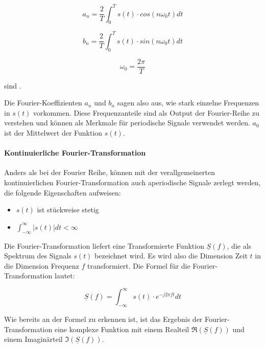 \begin{equation}
a_n = \frac{2}{T} \int_{0}^{T} s(t) \cdot cos(n\omega_0t) dt
\end{equation}

\begin{equation}
b_n = \frac{2}{T} \int_{0}^{T} s(t) \cdot sin(n\omega_0t) dt
\end{equation}

\begin{equation}
\omega_0 = \frac{2\pi}{T}
\end{equation}

sind \autocite[vgl.][S. 19f]{ries_fourier-reihe_2018}.

Die Fourier-Koeffizienten $a_n$ und $b_n$ sagen also aus, wie stark einzelne Frequenzen in $s(t)$ vorkommen.
Diese Frequenzanteile sind als Output der Fourier-Reihe zu verstehen und können als Merkmale für periodische Signale verwendet werden.
$a_0$ ist der Mittelwert der Funktion $s(t)$.

\paragraph{Kontinuierliche Fourier-Transformation}


Anders als bei der Fourier Reihe, können mit der verallgemeinerten kontinuierlichen Fourier-Transformation auch aperiodische Signale zerlegt werden, die folgende Eigenschaften aufweisen:

\begin{itemize}
    \item $s(t)$ ist stückweise stetig
    \item $\int_{-\infty}^{\infty} |s(t)| dt < \infty$
\end{itemize}

Die Fourier-Transformation liefert eine Transformierte Funktion $\underline{S}(f)$, die als Spektrum des Signals $s(t)$ bezeichnet wird.
Es wird also die Dimension Zeit $t$ in die Dimension Frequenz $f$ transformiert.
Die Formel für die Fourier-Transformation lautet:

\begin{equation}
    \underline{S}(f) = \int_{-\infty}^{\infty} s(t) \cdot e^{-j2\pi ft} dt
\end{equation}

Wie bereits an der Formel zu erkennen ist, ist das Ergebnis der Fourier-Transformation eine komplexe Funktion mit einem Realteil $\Re(\underline{S}(f))$ und einem Imaginärteil $\Im(\underline{S}(f))$.

